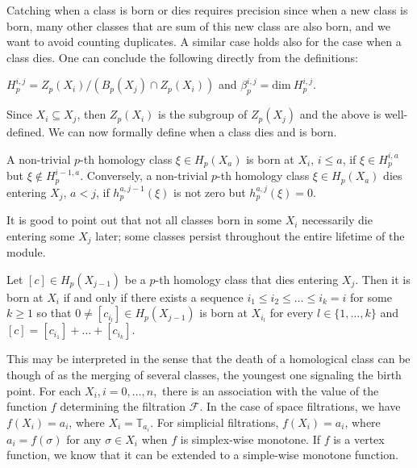Catching when a class is born or dies requires precision since when a new class is born, many other classes that are sum of this new class are also born, and we want to avoid counting duplicates. A similar case holds also for the case when a class dies. One can conclude the following directly from the definitions:

\begin{lemma}
  $H^{i,j}_{p} = Z_{p}(X_{i}) / (B_{p}(X_{j}) \cap Z_{p}(X_{i}))$ and $\beta^{i,j}_{p} = \text{dim}\:H^{i,j}_{p}$.
\end{lemma}
Since $X_{i} \subseteq X_{j}$, then $Z_{p}(X_{i})$ is the subgroup of $Z_{p}(X_{j})$ and the above is well-defined. We can now formally define when a class dies and is born.

\begin{definition}
  A non-trivial $p$-th homology class $\xi \in H_{p}(X_{a})$ is born at $X_{i}$, $i \leq a$, if $\xi \in H^{i, a}_{p}$ but $\xi \notin H^{i-1, a}_{p}$. Conversely, a non-trivial $p$-th homology class $\xi \in H_{p}(X_{a})$ dies entering $X_{j}$, $a < j$, if $h^{a, j-1}_{p}(\xi)$ is not zero but $h^{a, j}_{p}(\xi) = 0$.
\end{definition}

It is good to point out that not all classes born in some $X_{i}$ necessarily die entering some $X_{j}$ later; some classes persist throughout the entire lifetime of the module.

\begin{theorem}
  Let $[c] \in H_{p}(X_{j-1})$ be a $p$-th homology class that dies entering $X_{j}$. Then it is born at $X_{i}$ if and only if there exists a sequence $i_{1} \leq i_{2} \leq \ldots \leq i_{k} = i$ for some $k \geq 1$ so that $0 \neq [c_{i_{l}}] \in H_{p}(X_{j-1})$ is born at $X_{i_{l}}$ for every $l \in \{1, \ldots, k\}$ and $[c] = [c_{i_{1}}] + \ldots + [c_{i_{k}}].$
\end{theorem}

This may be interpreted in the sense that the death of a homological class can be though of as the merging of several classes, the youngest one signaling the birth point. For each $X_{i}, i = 0, \ldots, n,$ there is an association with the value of the function $f$ determining the filtration $\mathcal{F}$. In the case of space filtrations, we have $f(X_{i}) = a_{i}$, where $X_{i} = \mathbb{T}_{a_{i}}$. For simplicial filtrations, $f(X_{i}) = a_{i}$, where $a_{i} = f(\sigma)$ for any $\sigma \in X_{i}$ when $f$ is simplex-wise monotone. If $f$ is a vertex function, we know that it can be extended to a simple-wise monotone function.

